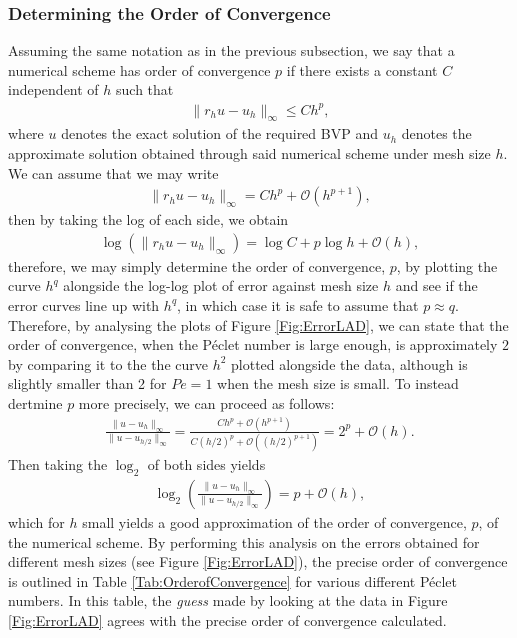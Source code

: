 \documentclass[a4paper,11pt]{article}
\theoremstyle{break}
\theoremstyle{break2}
\theoremstyle{break}
\theoremstyle{break2}
\newcommand{\cO}{\mathcal{O}}
\begin{document}
\subsubsection{Determining the Order of Convergence}\label{Sec:Determining the Order of Convergence}
Assuming the same notation as in the previous subsection, we say that a numerical scheme has order of convergence $ p $ if there exists a constant $ C $ independent of $ h $ such that
\begin{align*}
\|r_hu - u_h\|_{\infty} \leq C h^p,
\end{align*}
where $ u $ denotes the exact solution of the required BVP and $ u_h $ denotes the approximate solution obtained through said numerical scheme under mesh size $ h $. We can assume that we may write
\begin{align*}
\|r_h u - u_h\|_{\infty} = Ch^p + \cO(h^{p+1}),
\end{align*}
then by taking the log of each side, we obtain
\begin{align*}
\log(\|r_hu - u_h\|_{\infty}) = \log C + p\log h + \cO(h),
\end{align*}
therefore, we may simply determine the order of convergence, $ p $, by plotting the curve $ h^{q} $ alongside the log-log plot of error against mesh size $ h $ and see if the error curves line up with $ h^q $, in which case it is safe to assume that $ p \approx q $. Therefore, by analysing the plots of Figure \ref{Fig:ErrorLAD}, we can state that the order of convergence, when the P\'{e}clet number is large enough, is approximately $ 2 $ by comparing it to the the curve $ h^2 $ plotted alongside the data, although is slightly smaller than 2 for $ Pe = 1 $ when the mesh size is small. To instead dertmine $ p $ more precisely, we can proceed as follows:
\begin{align*}
\frac{\|u - u_{h}\|_{\infty}}{\|u-u_{h/2}\|_{\infty}} = \frac{C h^p + \cO(h^{p+1})}{C(h/2)^{p} + \cO((h/2)^{p+1})} = 2^p + \cO(h).
\end{align*}
Then taking the $ \log_2 $ of both sides yields
\begin{align*}
\log_2\left(\frac{\|u - u_{h}\|_{\infty}}{\|u-u_{h/2}\|_{\infty}}\right) = p + \cO(h),
\end{align*}
which for $ h $ small yields a good approximation of the order of convergence, $ p $, of the numerical scheme. By performing this analysis on the errors obtained for different mesh sizes (see Figure \ref{Fig:ErrorLAD}), the precise order of convergence is outlined in Table \ref{Tab:OrderofConvergence} for various different P\'{e}clet numbers. In this table, the \emph{guess} made by looking at the data in Figure \ref{Fig:ErrorLAD} agrees with the precise order of convergence calculated.
\end{document}

